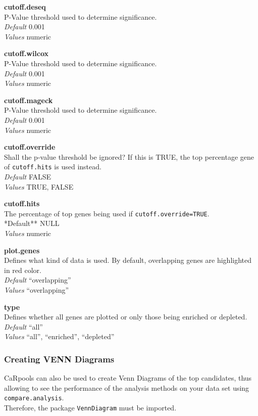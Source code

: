 \documentclass[]{article}
\begin{document}
\textbf{cutoff.deseq}\\
P-Value threshold used to determine significance.\\
\emph{Default} 0.001\\
\emph{Values} numeric

\textbf{cutoff.wilcox}\\
P-Value threshold used to determine significance.\\
\emph{Default} 0.001\\
\emph{Values} numeric

\textbf{cutoff.mageck}\\
P-Value threshold used to determine significance.\\
\emph{Default} 0.001\\
\emph{Values} numeric

\textbf{cutoff.override}\\
Shall the p-value threshold be ignored? If this is TRUE, the top
percentage gene of \texttt{cutoff.hits} is used instead.\\
\emph{Default} FALSE\\
\emph{Values} TRUE, FALSE

\textbf{cutoff.hits}\\
The percentage of top genes being used if
\texttt{cutoff.override=TRUE}.\\
*Default** NULL\\
\emph{Values} numeric

\textbf{plot.genes}\\
Defines what kind of data is used. By default, overlapping genes are
highlighted in red color.\\
\emph{Default} ``overlapping''\\
\emph{Values} ``overlapping''

\textbf{type}\\
Defines whether all genes are plotted or only those being enriched or
depleted.\\
\emph{Default} ``all''\\
\emph{Values} ``all'', ``enriched'', ``depleted''

\subsubsection{Creating VENN Diagrams}\label{creating-venn-diagrams}

CaRpools can also be used to create Venn Diagrams of the top candidates,
thus allowing to see the performance of the analysis methods on your
data set using \texttt{compare.analysis}.\\
Therefore, the package \texttt{VennDiagram} must be imported.
\end{document}
